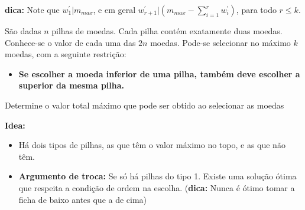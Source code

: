 \documentclass[12pt]{beamer}
\begin{document}
\begin{frame}
\begin{bloco}[\textcolor{black}{POI 2007 Weights} (\href{https://szkopul.edu.pl/problemset/problem/h_QPStxSmfEHuL2h_I5Qpa29/site/?key=statement}{szkopul})]

    
\textbf{dica:} Note que $w^{'}_1 \vert m_{max}$, e em geral $w^{'}_{r + 1} \vert (m_{max} - \sum\limits_{i=1}^r w^{'}_i)$, para todo $r \le k$.
    
\end{bloco}

\end{frame}


\begin{frame}
\begin{bloco}
São dadas $n$ pilhas de moedas. Cada pilha contém exatamente duas moedas. Conhece-se o valor de cada uma das $2n$ moedas. Pode-se selecionar no máximo $k$ moedas, com a seguinte restrição: 

\begin{itemize}
    \item \textbf{Se escolher a moeda inferior de uma pilha, também deve escolher a superior da mesma pilha.}
\end{itemize}

Determine o valor total máximo que pode ser obtido ao selecionar as moedas

\end{bloco}
\end{frame}

\begin{frame}
\begin{bloco}

\textbf{Idea:}
\begin{itemize}
    \item Há dois tipos de pilhas, as que têm o valor máximo no topo, e as que não têm.
    \pause
    \item \textbf{Argumento de troca:} Se só há pilhas do tipo 1. Existe uma solução ótima que respeita a condição de ordem na escolha. (\textbf{dica:} Nunca é ótimo tomar a ficha de baixo antes que a de cima)
\end{itemize}

\end{bloco}
\end{frame}
\end{document}
